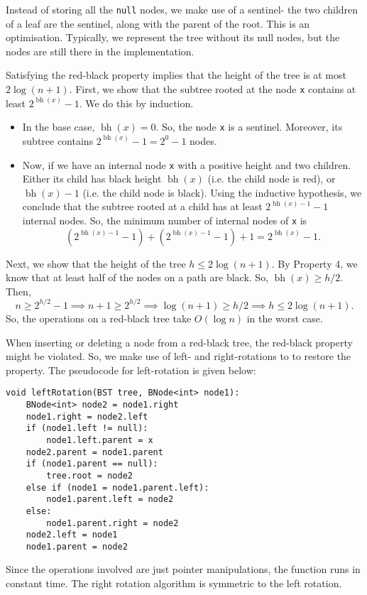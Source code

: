 \documentclass[a4paper, openany]{memoir}
\begin{document}
\noindent Instead of storing all the \texttt{null} nodes, we make use of a sentinel- the two children of a leaf are the sentinel, along with the parent of the root. This is an optimisation. Typically, we represent the tree without its null nodes, but the nodes are still there in the implementation.

\noindent Satisfying the red-black property implies that the height of the tree is at most $2 \log (n+1)$. First, we show that the subtree rooted at the node \texttt{x} contains at least $2^{\operatorname{bh}(x)} - 1$. We do this by induction.
\begin{itemize}
    \item In the base case, $\operatorname{bh}(x) = 0$. So, the node \texttt{x} is a sentinel. Moreover, its subtree contains $2^{\operatorname{bh}(x)} - 1 = 2^0-1$ nodes.
    \item Now, if we have an internal node \texttt{x} with a positive height and two children. Either its child has black height $\operatorname{bh}(x)$ (i.e. the child node is red), or $\operatorname{bh}(x) - 1$ (i.e. the child node is black). Using the inductive hypothesis, we conclude that the subtree rooted at a child has at least $2^{\operatorname{bh}(x) - 1} - 1$ internal nodes. So, the minimum number of internal nodes of \texttt{x} is
    \[(2^{\operatorname{bh}(x) - 1} - 1) + (2^{\operatorname{bh}(x) - 1} - 1) + 1 = 2^{\operatorname{bh}(x)} - 1.\]
\end{itemize}
Next, we show that the height of the tree $h \leq 2\log(n+1)$. By Property 4, we know that at least half of the nodes on a path are black. So, $\operatorname{bh}(x) \geq h/2$. Then,
\[n \geq 2^{h/2} - 1 \implies n + 1 \geq 2^{h/2} \implies \log (n+1) \geq h/2 \implies h \leq 2\log (n+1).\]
So, the operations on a red-black tree take $O(\log n)$ in the worst case.

\noindent When inserting or deleting a node from a red-black tree, the red-black property might be violated. So, we make use of left- and right-rotations to to restore the property. The pseudocode for left-rotation is given below:
\begin{lstlisting}[language=pseudocode]
void leftRotation(BST tree, BNode<int> node1):
    BNode<int> node2 = node1.right
    node1.right = node2.left
    if (node1.left != null):
        node1.left.parent = x
    node2.parent = node1.parent
    if (node1.parent == null):
        tree.root = node2
    else if (node1 = node1.parent.left):
        node1.parent.left = node2
    else:
        node1.parent.right = node2
    node2.left = node1
    node1.parent = node2
\end{lstlisting}
Since the operations involved are just pointer manipulations, the function runs in constant time. The right rotation algorithm is symmetric to the left rotation.
\end{document}
